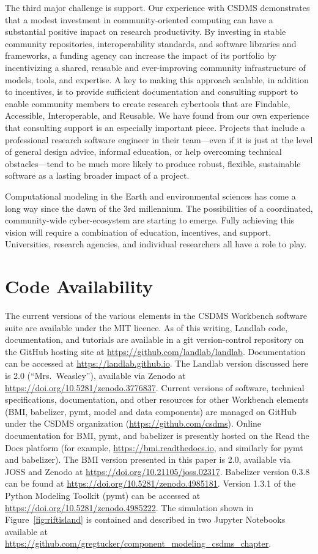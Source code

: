 \documentclass{article} %
\begin{document}
The third major challenge is support. Our experience with CSDMS demonstrates that a modest investment in community-oriented computing can have a substantial positive impact on research productivity. By investing in stable community repositories, interoperability standards, and software libraries and frameworks, a funding agency can increase the impact of its portfolio by incentivizing a shared, reusable and ever-improving community infrastructure of models, tools, and expertise. A key to making this approach scalable, in addition to incentives, is to provide sufficient documentation and consulting support to enable community members to create research cybertools that are Findable, Accessible, Interoperable, and Reusable. We have found from our own experience that consulting support is an especially important piece. Projects that include a professional research software engineer in their team---even if it is just at the level of general design advice, informal education, or help overcoming technical obstacles---tend to be much more likely to produce robust, flexible, sustainable software as a lasting broader impact of a project.

Computational modeling in the Earth and environmental sciences has come a long way since the dawn of the 3rd millennium. The possibilities of a coordinated, community-wide cyber-ecosystem are starting to emerge. Fully achieving this vision will require a combination of education, incentives, and support. Universities, research agencies, and individual researchers all have a role to play.


\section{Code Availability}

The current versions of the various elements in the CSDMS Workbench software suite are available under the MIT licence. As of this writing, Landlab code, documentation, and tutorials are available in a git version-control repository on the GitHub hosting site at \url{https://github.com/landlab/landlab}. Documentation can be accessed at \url{https://landlab.github.io}. The Landlab version discussed here is 2.0 (``Mrs.\ Weasley''), available via Zenodo at \url{ https://doi.org/10.5281/zenodo.3776837}. Current versions of software, technical specifications, documentation, and other resources for other Workbench elements (BMI, babelizer, pymt, model and data components) are managed on GitHub under the CSDMS organization (\url{https://github.com/csdms}). Online documentation for BMI, pymt, and babelizer is presently hosted on the Read the Docs platform (for example, \url{https://bmi.readthedocs.io}, and similarly for pymt and babelizer). The BMI version presented in this paper is 2.0, available via JOSS and Zenodo at  \url{https://doi.org/10.21105/joss.02317}. Babelizer version 0.3.8 can be found at \url{https://doi.org/10.5281/zenodo.4985181}. Version 1.3.1 of the Python Modeling Toolkit (pymt) can be accessed at \url{ https://doi.org/10.5281/zenodo.4985222}. The simulation shown in Figure~\ref{fig:riftisland} is contained and described in two Jupyter Notebooks available at \url{https://github.com/gregtucker/component_modeling_csdms_chapter}.
\end{document}
